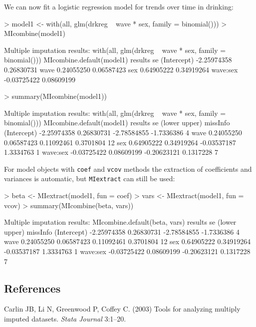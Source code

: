 \documentclass[12pt]{article}
\begin{document}
We can now fit a logistic regression model for trends over time in drinking:
\begin{Schunk}
\begin{Sinput}
> model1 <- with(all, glm(drkreg ~ wave * sex, family = binomial()))
> MIcombine(model1)
\end{Sinput}
\begin{Soutput}
Multiple imputation results:
      with(all, glm(drkreg ~ wave * sex, family = binomial()))
      MIcombine.default(model1)
                results         se
(Intercept) -2.25974358 0.26830731
wave         0.24055250 0.06587423
sex          0.64905222 0.34919264
wave:sex    -0.03725422 0.08609199
\end{Soutput}
\begin{Sinput}
> summary(MIcombine(model1))
\end{Sinput}
\begin{Soutput}
Multiple imputation results:
      with(all, glm(drkreg ~ wave * sex, family = binomial()))
      MIcombine.default(model1)
                results         se      (lower     upper) missInfo
(Intercept) -2.25974358 0.26830731 -2.78584855 -1.7336386      4 %
wave         0.24055250 0.06587423  0.11092461  0.3701804     12 %
sex          0.64905222 0.34919264 -0.03537187  1.3334763      1 %
wave:sex    -0.03725422 0.08609199 -0.20623121  0.1317228      7 %
\end{Soutput}
\end{Schunk}

For model objects with \texttt{coef} and \texttt{vcov} methods the
extraction of coefficients and variances is automatic, but \texttt{MIextract} can still be used:
\begin{Schunk}
\begin{Sinput}
> beta <- MIextract(model1, fun = coef)
> vars <- MIextract(model1, fun = vcov)
> summary(MIcombine(beta, vars))
\end{Sinput}
\begin{Soutput}
Multiple imputation results:
      MIcombine.default(beta, vars)
                results         se      (lower     upper) missInfo
(Intercept) -2.25974358 0.26830731 -2.78584855 -1.7336386      4 %
wave         0.24055250 0.06587423  0.11092461  0.3701804     12 %
sex          0.64905222 0.34919264 -0.03537187  1.3334763      1 %
wave:sex    -0.03725422 0.08609199 -0.20623121  0.1317228      7 %
\end{Soutput}
\end{Schunk}


\subsection*{References}

Carlin JB, Li N, Greenwood P, Coffey C. (2003) Tools for analyzing multiply imputed datasets. \emph{Stata Journal} 3:1--20.
\end{document}
